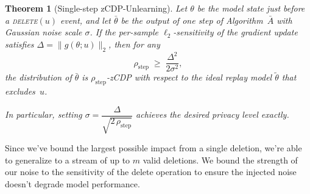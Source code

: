 \documentclass[a4paper,12pt]{article}
\newtheorem{theorem}{Theorem}[section]
\begin{document}
\begin{theorem}[Single-step zCDP-Unlearning]
\label{thm:single-step-zcdp}
Let $\theta$ be the model state just before a
\textsc{delete}$(u)$ event, and let
$\bar\theta$ be the output of one step of Algorithm~$\bar A$
with Gaussian noise scale $\sigma$.
If the per-sample $\ell_2$-sensitivity of the gradient update satisfies
$\Delta=\|g(\theta;u)\|_2$, then for any
$$
  \rho_{\mathrm{step}}
  \;\ge\;\frac{\Delta^{2}}{2\sigma^{2}},
$$
the distribution of $\bar\theta$ is $\rho_{\mathrm{step}}$-zCDP with
respect to the ideal replay model $\tilde\theta$ that excludes~$u$.

In particular, setting
\(
  \sigma
  =\dfrac{\Delta}{\sqrt{2\,\rho_{\mathrm{step}}}}
\)
achieves the desired privacy level exactly.
\end{theorem}

Since we've bound the largest possible impact from a single deletion, we're able to generalize to a stream of up to $m$ valid deletions. We bound the strength of our noise to the sensitivity of the delete operation to ensure the injected noise doesn't degrade model performance.
\end{document}
